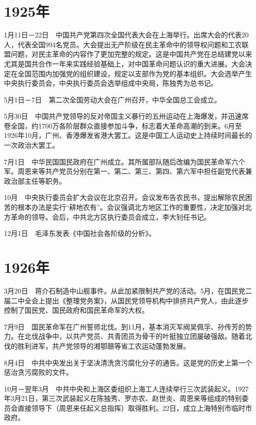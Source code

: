 \documentclass[10pt,a4paper,twocolumn]{book}
\begin{document}
\section{1925年}

1月11日－22日　中国共产党第四次全国代表大会在上海举行。出席大会的代表20人，代表全国994名党员。大会提出无产阶级在民主革命中的领导权问题和工农联盟问题，对民主革命的内容作了更加完整的规定。这是中国共产党在总结建党以来尤其是国共合作一年来实践经验基础上，对中国革命问题认识的重大进展。大会决定在全国范围内加强党的组织建设，规定以支部作为党的基本组织。大会选举产生中央执行委员会，中央执行委员会选举组成中央局，陈独秀为总书记。

5月1日－7日　第二次全国劳动大会在广州召开，中华全国总工会成立。

5月30日　中国共产党领导的反对帝国主义暴行的五卅运动在上海爆发，并迅速席卷全国，约1700万各阶层群众直接参加斗争，标志着大革命高潮的到来。6月至1926年10月，广州、香港爆发省港大罢工。这是中国工人运动史上持续时间最长的一次政治大罢工。

7月1日　中华民国国民政府在广州成立。其所属部队随后改编为国民革命军六个军。周恩来等共产党员分别在第一、第二、第三、第四、第六军中担任副党代表兼政治部主任等职务。

10月　中央执行委员会扩大会议在北京召开。会议发布告农民书，提出解除农民困苦的根本办法是实行“耕地农有”。会议强调北方地区工作的重要性，决定加强对北方革命的领导。会后，中共北方区执行委员会成立，李大钊任书记。

12月1日　毛泽东发表《中国社会各阶级的分析》。

\section{1926年}

3月20日　蒋介石制造中山舰事件。从此加紧限制共产党的活动。5月，在国民党二届二中全会上提出《整理党务案》，从国民党领导机构中排挤共产党人，由此逐步控制了国民党、国民政府和国民革命军的大权。

7月9日　国民革命军在广州誓师北伐。到11月，基本消灭军阀吴佩孚、孙传芳的势力。在北伐战争中，以共产党员、共青团员为骨干的叶挺独立团屡破强敌。随着北伐的胜利进军，共产党领导的湘鄂赣等省工农运动蓬勃发展。

8月4日　中共中央发出关于坚决清洗贪污腐化分子的通告。这是党的历史上第一个惩治贪污腐败的文件。

10月－翌年3月　中共中央和上海区委组织上海工人连续举行三次武装起义。1927年3月21日，第三次武装起义在陈独秀、罗亦农、赵世炎、周恩来等组成的特别委员会直接领导下（周恩来任起义总指挥）取得胜利。22日，成立上海特别市临时市政府。
\end{document}
